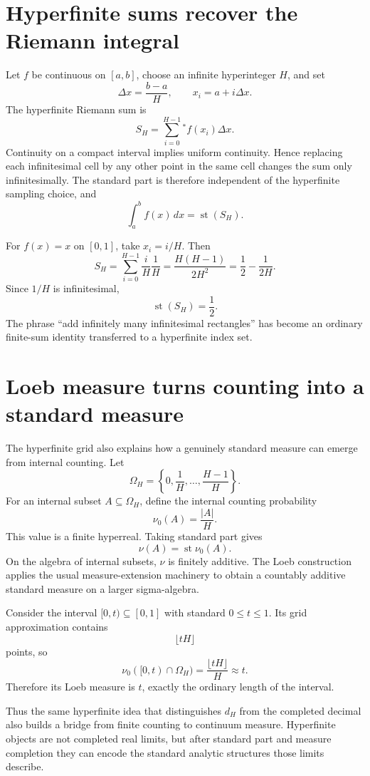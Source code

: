\section{Hyperfinite sums recover the Riemann integral}

Let \(f\) be continuous on \([a,b]\), choose an infinite hyperinteger \(H\), and set
\[
  \Delta x=\frac{b-a}{H},
  \qquad
  x_i=a+i\Delta x.
\]
The hyperfinite Riemann sum is
\[
  S_H=\sum_{i=0}^{H-1}{}^*f(x_i)\Delta x.
\]
Continuity on a compact interval implies uniform continuity.  Hence replacing each infinitesimal cell by any other point in the same cell changes the sum only infinitesimally.  The standard part is therefore independent of the hyperfinite sampling choice, and
\[
  \boxed{
  \int_a^b f(x)\,dx=\operatorname{st}(S_H).}
\]

For \(f(x)=x\) on \([0,1]\), take \(x_i=i/H\).  Then
\[
  S_H
  =\sum_{i=0}^{H-1}\frac{i}{H}\frac1H
  =\frac{H(H-1)}{2H^2}
  =\frac12-\frac1{2H}.
\]
Since \(1/H\) is infinitesimal,
\[
  \operatorname{st}(S_H)=\frac12.
\]
The phrase “add infinitely many infinitesimal rectangles” has become an ordinary finite-sum identity transferred to a hyperfinite index set.

\section{Loeb measure turns counting into a standard measure}

The hyperfinite grid also explains how a genuinely standard measure can emerge from internal counting.  Let
\[
  \Omega_H=\left\{0,\frac1H,\ldots,\frac{H-1}{H}\right\}.
\]
For an internal subset \(A\subseteq\Omega_H\), define the internal counting probability
\[
  \nu_0(A)=\frac{|A|}{H}.
\]
This value is a finite hyperreal.  Taking standard part gives
\[
  \nu(A)=\operatorname{st}\nu_0(A).
\]
On the algebra of internal subsets, \(\nu\) is finitely additive.  The Loeb construction applies the usual measure-extension machinery to obtain a countably additive standard measure on a larger sigma-algebra.

Consider the interval \([0,t)\subseteq[0,1]\) with standard \(0\le t\le1\).  Its grid approximation contains
\[
  \lfloor tH\rfloor
\]
points, so
\[
  \nu_0([0,t)\cap\Omega_H)
  =\frac{\lfloor tH\rfloor}{H}
  \approx t.
\]
Therefore its Loeb measure is \(t\), exactly the ordinary length of the interval.

Thus the same hyperfinite idea that distinguishes \(d_H\) from the completed decimal also builds a bridge from finite counting to continuum measure.  Hyperfinite objects are not completed real limits, but after standard part and measure completion they can encode the standard analytic structures those limits describe.